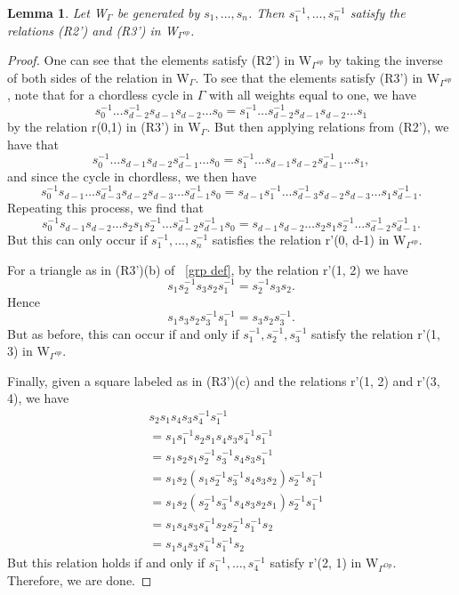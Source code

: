 \documentclass[11pt]{amsart}
\newtheorem{lem}[thm]{Lemma}
\theoremstyle{definition}
\begin{document}
\begin{lem}\label{lem:op_homomorphism}
Let W$_{\Gamma}$ be generated by $s_{1}, \dots, s_{n}$. Then $s_{1}^{-1}, \dots, s_{n}^{-1}$ satisfy the relations (R2') and (R3') in W$_{\Gamma^{op}}$.
\end{lem}
\begin{proof}
One can see that the elements satisfy (R2') in W$_{\Gamma^{op}}$ by taking the inverse of both sides of the relation in W$_{\Gamma}$. To see that the elements satisfy (R3') in W$_{\Gamma^{op}}$, note that for a chordless cycle in $\Gamma$ with all weights equal to one, we have $$s_{0}^{-1}\dots s_{d-2}^{-1}s_{d-1}s_{d-2}\dots s_{0} = s_{1}^{-1}\dots s_{d-2}^{-1}s_{d-1}s_{d-2}\dots s_{1}$$ by the relation r(0,1) in (R3') in W$_{\Gamma}$. But then applying relations from (R2'), we have that $$s_{0}^{-1}\dots s_{d-1}s_{d-2}s_{d-1}^{-1}\dots s_{0} = s_{1}^{-1}\dots s_{d-1}s_{d-2}s_{d-1}^{-1}\dots s_{1},$$ and since the cycle in chordless, we then have $$s_{0}^{-1}s_{d-1}\dots s_{d-3}^{-1}s_{d-2}s_{d-3}\dots s_{d-1}^{-1}s_{0} = s_{d-1}s_{1}^{-1}\dots s_{d-3}^{-1}s_{d-2}s_{d-3}\dots s_{1}s_{d-1}^{-1}.$$ Repeating this process, we find that $$s_{0}^{-1}s_{d-1}s_{d-2}\dots s_{2}s_{1}s_{2}^{-1}\dots s_{d-2}^{-1}s_{d-1}^{-1}s_{0} = s_{d-1}s_{d-2}\dots s_{2}s_{1}s_{2}^{-1}\dots s_{d-2}^{-1}s_{d-1}^{-1}.$$ But this can only occur if $s_{1}^{-1}, \dots, s_{n}^{-1}$ satisfies the relation r'(0, d-1) in W$_{\Gamma^{op}}.$ 

For a triangle as in (R3')(b) of ~\ref{grp def}, by the relation r'(1, 2) we have $$s_{1}s_{2}^{-1}s_{3}s_{2}s_{1}^{-1} = s_{2}^{-1}s_{3}s_{2}.$$ Hence $$s_{1}s_{3}s_{2}s_{3}^{-1}s_{1}^{-1} = s_{3}s_{2}s_{3}^{-1}.$$ But as before, this can occur if and only if $s_{1}^{-1}, s_{2}^{-1}, s_{3}^{-1}$ satisfy the relation r'(1, 3) in W$_{\Gamma^{op}}$.

Finally, given a square labeled as in (R3')(c) and the relations r'(1, 2) and r'(3, 4), we have 
\begin{align*}
& s_{2}s_{1}s_{4}s_{3}s_{4}^{-1}s_{1}^{-1} \\
&= s_{1}s_{1}^{-1}s_{2}s_{1}s_{4}s_{3}s_{4}^{-1}s_{1}^{-1} \\
&= s_{1}s_{2}s_{1}s_{2}^{-1}s_{3}^{-1}s_{4}s_{3}s_{1}^{-1} \\
&= s_{1}s_{2}(s_{1}s_{2}^{-1}s_{3}^{-1}s_{4}s_{3}s_{2})s_{2}^{-1}s_{1}^{-1} \\
&= s_{1}s_{2}(s_{2}^{-1}s_{3}^{-1}s_{4}s_{3}s_{2}s_{1})s_{2}^{-1}s_{1}^{-1} \\
&= s_{1}s_{4}s_{3}s_{4}^{-1}s_{2}s_{2}^{-1}s_{1}^{-1}s_{2} \\
&= s_{1}s_{4}s_{3}s_{4}^{-1}s_{1}^{-1}s_{2}
\end{align*}
But this relation holds if and only if $s_{1}^{-1}, \dots, s_{4}^{-1}$ satisfy r'(2, 1) in W$_{\Gamma^{Op}}$. Therefore, we are done.
\end{proof}
\end{document}
